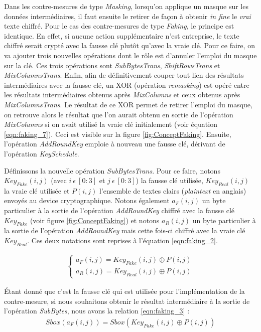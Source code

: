 \documentclass[oneside]{book}
\begin{document}
Dans les contre-mesures de type \textit{Masking}, lorsqu'on applique un masque sur les données intermédiaires, il faut ensuite le retirer de façon à obtenir \textit{in fine} le \textit{vrai} texte chiffré. Pour le cas des contre-mesures de type \textit{Faking}, le principe est identique. En effet, si aucune action supplémentaire n'est entreprise, le texte chiffré serait crypté avec la fausse clé plutôt qu'avec la vraie clé. Pour ce faire, on va ajouter trois nouvelles opérations dont le rôle est d'annuler l'emploi du masque sur la clé. Ces trois opérations sont \textit{SubBytesTrans}, \textit{ShiftRowsTrans} et \textit{MixColumnsTrans}. Enfin, afin de définitivement couper tout lien des résultats intermédiaires avec la fausse clé, un XOR (opération \textit{remasking}) est opéré entre les résultats intermédiaires obtenus après \textit{MixColumns} et ceux obtenus après \textit{MixColumnsTrans}. Le résultat de ce XOR permet de retirer l'emploi du masque, on retrouve alors le résultat que l'on aurait obtenu en sortie de l'opération \textit{MixColumns} si on avait utilisé la vraie clé initialement (voir équation \ref{eqn:faking_7}). Ceci est visible sur la figure \ref{fig:ConceptFaking}. Ensuite, l'opération \textit{AddRoundKey} emploie à nouveau une fausse clé, dérivant de l'opération \textit{KeySchedule}.

Définissons la nouvelle opération \textit{SubBytesTrans}. Pour ce faire, notons $Key_{Fake}(i,j)$ (avec $i \ \epsilon \ [0:3]$ et $j \ \epsilon \ [0:3]$) la fausse clé utilisée, $Key_{Real}(i,j)$ la vraie clé utilisée et $P(i,j)$ l'ensemble de textes clairs (\textit{plaintext} en anglais) envoyés au device cryptographique. Notons également $a_{F}(i,j)$ un byte particulier à la sortie de l'opération \textit{AddRoundKey} chiffré avec la fausse clé $Key_{Fake}$ (voir figure \ref{fig:ConceptFaking}) et notons $a_{R}(i,j)$ un byte particulier à la sortie de l'opération \textit{AddRoundKey} mais cette fois-ci chiffré avec la vraie clé $Key_{Real}$. Ces deux notations sont reprises à l'équation \ref{eqn:faking_2}.

\begin{gather}
	\left\{\begin{matrix}
	a_{F}(i,j) = Key_{Fake}(i,j) \oplus P(i,j) \\ 
	a_{R}(i,j) = Key_{Real}(i,j) \oplus P(i,j)
	\end{matrix}\right.\label{eqn:faking_2}
\end{gather}

\hspace{-0.5cm}Étant donné que c'est la fausse clé qui est utilisée pour l'implémentation de la contre-mesure, si nous souhaitons obtenir le résultat intermédiaire à la sortie de l'opération \textit{SubBytes}, nous avons la relation \ref{eqn:faking_3} :
\begin{gather}
	Sbox(a_{F}(i,j)) = Sbox(Key_{Fake}(i,j) \oplus P(i,j))\label{eqn:faking_3}
\end{gather}
\end{document}
